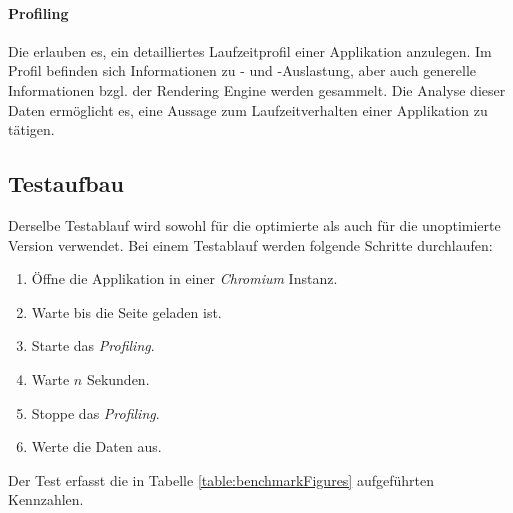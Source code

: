 \paragraph{Profiling}
Die  erlauben es, ein detailliertes Laufzeitprofil einer Applikation anzulegen.
Im Profil befinden sich Informationen zu - und -Auslastung, aber auch generelle Informationen bzgl. der \gls{Rendering Engine} werden gesammelt.
Die Analyse dieser Daten ermöglicht es, eine Aussage zum Laufzeitverhalten einer Applikation zu tätigen.

\subsection{Testaufbau}
Derselbe Testablauf wird sowohl für die optimierte als auch für die unoptimierte Version verwendet.
Bei einem Testablauf werden folgende Schritte durchlaufen:

\begin{enumerate}
  \item Öffne die Applikation in einer \emph{Chromium} Instanz.
  \item Warte bis die Seite geladen ist.
  \item Starte das \emph{Profiling}.
  \item Warte $n$ Sekunden.
  \item Stoppe das \emph{Profiling}.
  \item Werte die Daten aus.
\end{enumerate}

Der Test erfasst die in Tabelle \ref{table:benchmarkFigures} aufgeführten Kennzahlen.

